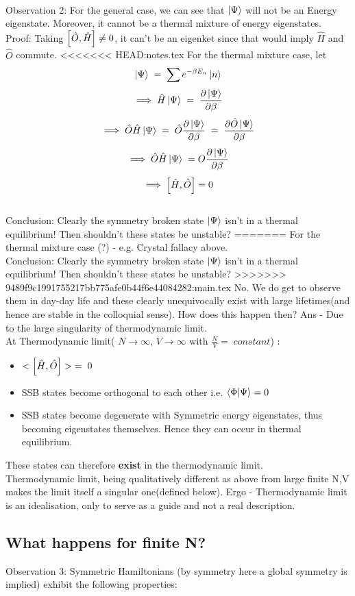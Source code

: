 \documentclass[12pt]{article}
\begin{document}
\\
Observation 2: For the general case, we can see that $\ket{\Psi}$ will not be an Energy eigenstate. Moreover, it cannot be a thermal mixture of energy eigenstates.\\
Proof: Taking $\comm{\hat{O}}{\hat{H}}\neq 0$, it can't be an eigenket since that would imply $\hat{H}$ and $\hat{O}$ commute.
<<<<<<< HEAD:notes.tex
For the thermal mixture case, let
$$\ket{\Psi}\;=\;\sum e^{-\beta E_n }\ket{n}$$
$$\implies \hat{H}\ket{\Psi}\;=\;\pdv{\ket{\Psi}}{\beta}$$
$$\implies \hat{O}\hat{H}\ket{\Psi}\;=\; \hat{O}\pdv{\ket{\Psi}}{\beta}\;=\;\pdv{\hat{O}\ket{\Psi}}{\beta}$$
$$\implies \hat{O}\hat{H}\ket{\Psi}\;= O \pdv{\ket{\Psi}}{\beta} $$
$$\implies \comm{\hat{H}}{\hat{O}}=0$$
\\
Conclusion: Clearly the symmetry broken state $\ket{\Psi}$ isn't in a thermal equilibrium! Then shouldn't these states be unstable?
=======
For the thermal mixture case (?) - e.g. Crystal fallacy above.\\
\newline
Conclusion: Clearly the symmetry broken state $\ket{\Psi}$ isn't in a thermal equilibrium! Then shouldn't these states be unstable?
>>>>>>> 9489f9c1991755217bb775afe0b44f6e44084282:main.tex
No. We do get to observe them in day-day life and these clearly unequivocally exist with large lifetimes(and hence are stable in the colloquial sense).
How does this happen then? Ans - Due to the large singularity of thermodynamic limit. \\
At Thermodynamic limit( $N\rightarrow \infty$, $V\rightarrow \infty$ with $\displaystyle{\frac{N}{V}=\; constant}$) :
\begin{itemize}
    \item  $<\comm{\hat{H}}{\hat{O}}>\;=\;0$
    \item SSB states become orthogonal to each other i.e. $\braket{\Phi}{\Psi}=0$
    \item SSB states become degenerate with Symmetric energy eigenstates, thus becoming eigenstates themselves. Hence they can occur in thermal equilibrium.
\end{itemize}
These states can therefore \textbf{exist} in the thermodynamic limit.\\
Thermodynamic limit, being qualitatively different as above from large finite N,V makes the limit itself a singular one(defined below). Ergo - Thermodynamic limit is an idealisation, only to serve as a guide and not a real description.
\subsection{What happens for finite N?}
Observation 3: Symmetric Hamiltonians (by symmetry here a global symmetry is implied) exhibit the following properties:
\end{document}
